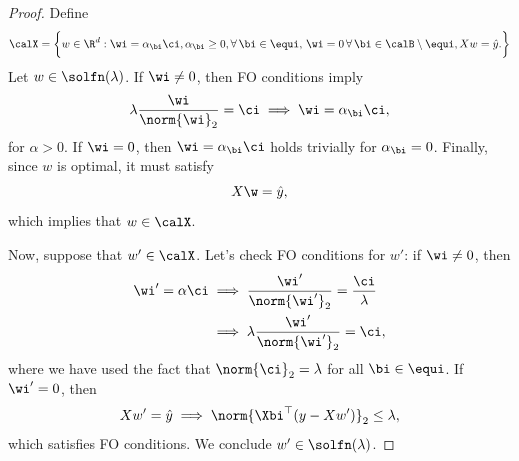 \solutionFunctionAlt*
\begin{proof}
	Define
	\[
		\calX =
		\bigg\{ w \in \R^d :
		\wi = \alpha_\bi \ci, \alpha_\bi \geq 0, \forall \, \bi \in \equi, \,
		\wi = 0 \, \forall \, \bi \in \calB \setminus \equi,
		X w = \hat y.
		\bigg\}
	\]
	Let \( w \in \solfn(\lambda) \).
	If \( \wi \neq 0 \), then FO conditions imply
	\[
		\lambda \frac{\wi}{\norm{\wi}_2} = \ci \implies \wi = \alpha_\bi \ci,
	\]
	for \( \alpha > 0 \).
	If \( \wi = 0 \), then \( \wi = \alpha_\bi \ci \) holds trivially for
	\( \alpha_\bi = 0 \).
	Finally, since \( w \) is optimal, it must satisfy
	\[
		X \w = \hat y,
	\]
	which implies that \( w \in \calX \).

	Now, suppose that \( w' \in \calX \).
	Let's check FO conditions for \( w' \):
	if \( \wi \neq 0 \), then
	\begin{align*}
		\wi' = \alpha \ci
		 & \implies \frac{\wi'}{\norm{\wi'}_2} = \frac{\ci}{\lambda} \\
		 & \implies \lambda \frac{\wi'}{\norm{\wi'}_2} = \ci,
	\end{align*}
	where we have used the fact that \( \norm{\ci}_2 = \lambda \)
	for all \( \bi \in \equi \).
	If \( \wi' = 0 \), then
	\[
		X w' = \hat y \implies \norm{\Xbi^\top (y - Xw')}_2 \leq \lambda,
	\]
	which satisfies FO conditions.
	We conclude \( w' \in \solfn(\lambda) \).
\end{proof}


